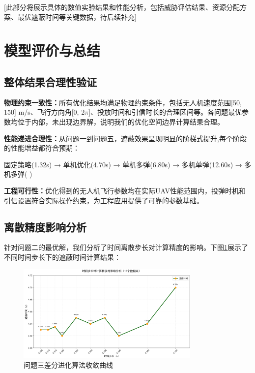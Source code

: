 \documentclass[fontset=SimSun]{ctexart}
\begin{document}
[此部分将展示具体的数值实验结果和性能分析，包括威胁评估结果、资源分配方案、最优遮蔽时间等关键数据，待后续补充]

\section{模型评价与总结}

\subsection{整体结果合理性验证}

\textbf{物理约束一致性：}所有优化结果均满足物理约束条件，包括无人机速度范围[50, 150] m/s、飞行方向角[0, 2$\pi$]、投放时间和引信时长的合理区间等。各问题最优参数均位于内部，未出现边界解，说明我们的优化空间边界计算结果合理。

\textbf{性能递进合理性：}从问题一到问题五，遮蔽效果呈现明显的阶梯式提升,每个阶段的性能增益都符合预期：

固定策略(1.32s) → 单机优化(4.70s) → 单机多弹(6.80s) → 多机单弹(12.60s) → 多机多弹( )

\textbf{工程可行性：}优化得到的无人机飞行参数均在实际UAV性能范围内，投弹时机和引信设置符合实际操作约束，为工程应用提供了可靠的参数基础。

\subsection{离散精度影响分析}

针对问题二的最优解，我们分析了时间离散步长对计算精度的影响。下图\ref{步长-遮蔽时间-题2}展示了不同时间步长下的遮蔽时间计算结果：

\begin{figure}[H]
    \centering
    \includegraphics[width=0.8\textwidth]{10.不同时间步长对最终遮蔽时间-问题2.png}
    \caption{问题三差分进化算法收敛曲线}
    \label{步长-遮蔽时间-题2}
\end{figure}
\end{document}
